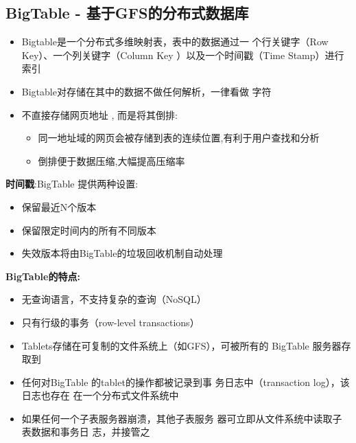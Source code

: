 \documentclass[UTF8,a4paper]{ctexart}
\begin{document}
\subsection{BigTable - 基于GFS的分布式数据库}
\begin{itemize}
  \item Bigtable是一个分布式多维映射表，表中的数据通过一
  个行关键字（Row Key）、一个列关键字（Column Key
  ）以及一个时间戳（Time Stamp）进行索引
  \item Bigtable对存储在其中的数据不做任何解析，一律看做
  字符
  \item 不直接存储网页地址 , 而是将其倒排:
  \begin{itemize}
    \item 同一地址域的网页会被存储到表的连续位置,有利于用户查找和分析
    \item 倒排便于数据压缩,大幅提高压缩率
  \end{itemize}
\end{itemize}

\textbf{时间戳}:BigTable 提供两种设置:
\begin{itemize}
  \item 保留最近N个版本
  \item 保留限定时间内的所有不同版本
  \item 失效版本将由BigTable的垃圾回收机制自动处理
\end{itemize}

\textbf{BigTable的特点:}
\begin{itemize}
  \item 无查询语言，不支持复杂的查询（NoSQL）
  \item 只有行级的事务（row-level transactions）
  \item Tablets存储在可复制的文件系统上（如GFS），可被所有的 BigTable 服务器存取到
  \item 任何对BigTable 的tablet的操作都被记录到事
务日志中（transaction log），该日志也存在
在一个分布式文件系统中
  \item 如果任何一个子表服务器崩溃，其他子表服务
器可立即从文件系统中读取子表数据和事务日
志，并接管之
\end{itemize}



\end{document}
